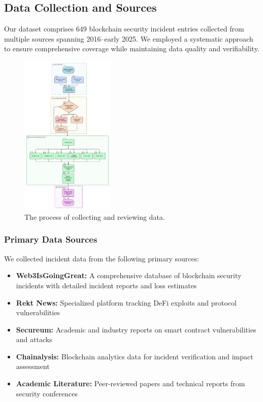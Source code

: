 \subsection{Data Collection and Sources}
\label{sec:data_collection}

Our dataset comprises 649 blockchain security incident entries collected from multiple sources spanning 2016--early 2025. We employed a systematic approach to ensure comprehensive coverage while maintaining data quality and verifiability.

\begin{figure}[H]
    \centering
    \includegraphics[width=0.4\textwidth]{../figure/methodology/collect_data.jpg}
    \caption{The process of collecting and reviewing data.}
    \label{fig:collect_data}
\end{figure}

\subsubsection{Primary Data Sources}
We collected incident data from the following primary sources:
\begin{itemize}
    \item \textbf{Web3IsGoingGreat:} A comprehensive database of blockchain security incidents with detailed incident reports and loss estimates
    \item \textbf{Rekt News:} Specialized platform tracking DeFi exploits and protocol vulnerabilities
    \item \textbf{Secureum:} Academic and industry reports on smart contract vulnerabilities and attacks
    \item \textbf{Chainalysis:} Blockchain analytics data for incident verification and impact assessment
    \item \textbf{Academic Literature:} Peer-reviewed papers and technical reports from security conferences
\end{itemize}

